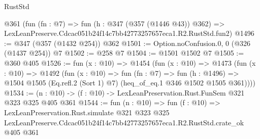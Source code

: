 \begin{lexlean}{RustStd}
\begin{coremodule}
    @361
    (fun (fn : @7) =>
    fun (h : @347 (@357 (@1446 @43)) @362) =>
    LexLeanPreserve.Cdcac051b24f14c7bb42773257657eca1.R2.RustStd.fun2)
@1496 := @347 (@357 (@1432 @254)) @362
@1501 := Option.noConfusion.{0, 0} (@326 (@1437 @254)) @7
@1502 := @258 @7
@1504 := @1501 @1502 @7
@1505 := @360 @405
@1526 := fun (x : @10) =>
  @1454
    (fun (x : @10) =>
    @1473
      (fun (x : @10) =>
      @1492
        (fun (x : @10) =>
        fun (fn : @7) =>
        fun (h : @1496) =>
        @1504 @1505 (Eq.refl.{2} (Sort 1) @7) (heq_of_eq.{1} @346 @1502 @1505 @361))))
@1534 := (n : @10) -> (f : @10) -> LexLeanPreservation.Rust.FunSem @321 @323 @325 @405 @361
@1544 := fun (n : @10) =>
  fun (f : @10) =>
  LexLeanPreservation.Rust.simulate
    @321
    @323
    @325
    LexLeanPreserve.Cdcac051b24f14c7bb42773257657eca1.R2.RustStd.crate_ok
    @405
    @361
\end{coremodule}
\end{lexlean}
